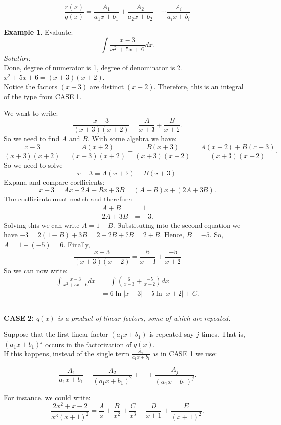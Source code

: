 \documentclass[reqno]{amsart}
\theoremstyle{definition}
\newtheorem{eg}[lem]{Example}
\numberwithin{equation}{section}
\begin{document}
\[ \frac{r(x)}{q(x)} = \frac{A_1}{a_1x+b_1} + \frac{A_2}{a_2x+b_2} + \cdots \frac{A_i}{a_ix+b_i}\]


\begin{eg} Evaluate: \[ \int \frac{x-3}{x^2+5x+6} dx.\]
{\it Solution:}\\
 Done, degree of numerator is 1, degree of denominator is 2.\\
 $x^2+5x+6=(x+3)(x+2)$.\\
 Notice the factors $(x+3)$ are distinct $(x+2)$. Therefore, this is an integral of the type from CASE 1.

We want to write:
\[  \frac{x-3}{(x+3)(x+2)} = \frac{A}{x+3} + \frac{B}{x+2}.\]
So we need to find $A$ and $B$.  With some algebra we have:
\[  \frac{x-3}{(x+3)(x+2)} = \frac{A(x+2)}{(x+3)(x+2)} + \frac{B(x+3)}{(x+3)(x+2)} = \frac{A(x+2)+B(x+3)}{(x+3)(x+2)}.\]
So we need to solve
\[ x-3 = A(x+2)+B(x+3). \]
Expand and compare coefficients:
\[ x-3 = Ax+2A+Bx+3B=(A+B)x+(2A+3B). \]
The coefficients must match and therefore:
\begin{align*}
A+B &= 1\\
2A+3B &= -3.
\end{align*}
Solving this we can write $A=1-B$.  Substituting into the second equation we have $-3=2(1-B)+3B=2-2B+3B=2+B$.  Hence, $B=-5$.  So, $A=1-(-5)=6$.
Finally,
\[ \frac{x-3}{(x+3)(x+2)} = \frac{6}{x+3} + \frac{-5}{x+2} \]
So we can now write:
\begin{align*}
\int \frac{x-3}{x^2+5x+6} dx &= \int \left( \frac{6}{x+3} + \frac{-5}{x+2}\right) dx \\
&= 6\ln|x+3|-5\ln|x+2| +C.
\end{align*}
\end{eg}

\hrule
\vspace{1pc}

{\bf CASE 2:} {\it $q(x)$ is a product of linear factors, some of which are repeated.}

Suppose that the first linear factor $(a_1 x +b_1)$ is repeated say $j$ times.  That is, $(a_1x+b_1)^j$ occurs in the factorization of $q(x)$.\\

If this happens, instead of the single term $\frac{A_1}{a_1 x +b_1}$ as in CASE 1 we use:

\[ \frac{A_1}{a_1x+b_1} + \frac{A_2}{(a_1x+b_1)^2} + \cdots + \frac{A_j}{(a_1x+b_1)^j}. \]

For instance, we could write:
\[ \frac{2x^2+x-2}{x^3(x+1)^2} = \frac{A}{x}+\frac{B}{x^2}+\frac{C}{x^3}+\frac{D}{x+1}+\frac{E}{(x+1)^2}.\]
\end{document}
